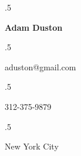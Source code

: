 \documentclass[overlapped, 10pt]{res} %
\begin{document}

\moveleft.5\hoffset\centerline{\large\bf Adam Duston} %
 
 
\moveleft.5\hoffset\centerline{aduston@gmail.com}%
\moveleft.5\hoffset\centerline{312-375-9879}
\moveleft.5\hoffset\centerline{New York City}

\end{document}
